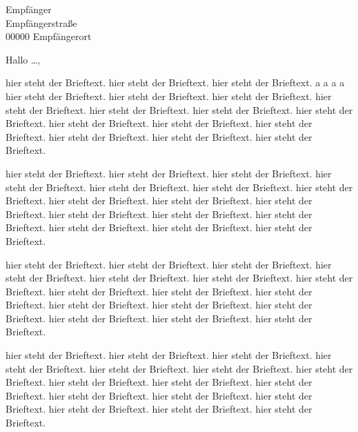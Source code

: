 \documentclass[fontsize=11pt, ngerman]{scrlttr2}
\begin{document}

 \begin{letter}{Empfänger\\
  Empfängerstraße\\
  00000 Empfängerort}




  \opening{Hallo \dots,}

  hier steht der Brieftext. hier steht der Brieftext. hier steht der Brieftext. a a a a hier steht der Brieftext.
  hier steht der Brieftext. hier steht der Brieftext. hier steht der Brieftext. hier steht der Brieftext.
  hier steht der Brieftext. hier steht der Brieftext. hier steht der Brieftext. hier steht der Brieftext.
  hier steht der Brieftext. hier steht der Brieftext. hier steht der Brieftext. hier steht der Brieftext.

  hier steht der Brieftext. hier steht der Brieftext. hier steht der Brieftext. hier steht der Brieftext.
  hier steht der Brieftext. hier steht der Brieftext. hier steht der Brieftext. hier steht der Brieftext.
  hier steht der Brieftext. hier steht der Brieftext. hier steht der Brieftext. hier steht der Brieftext.
  hier steht der Brieftext. hier steht der Brieftext. hier steht der Brieftext. hier steht der Brieftext.

  hier steht der Brieftext. hier steht der Brieftext. hier steht der Brieftext. hier steht der Brieftext.
  hier steht der Brieftext. hier steht der Brieftext. hier steht der Brieftext. hier steht der Brieftext.
  hier steht der Brieftext. hier steht der Brieftext. hier steht der Brieftext. hier steht der Brieftext.
  hier steht der Brieftext. hier steht der Brieftext. hier steht der Brieftext. hier steht der Brieftext.

  hier steht der Brieftext. hier steht der Brieftext. hier steht der Brieftext. hier steht der Brieftext.
  hier steht der Brieftext. hier steht der Brieftext. hier steht der Brieftext. hier steht der Brieftext.
  hier steht der Brieftext. hier steht der Brieftext. hier steht der Brieftext. hier steht der Brieftext.
  hier steht der Brieftext. hier steht der Brieftext. hier steht der Brieftext. hier steht der Brieftext.


\end{letter}
\end{document}
